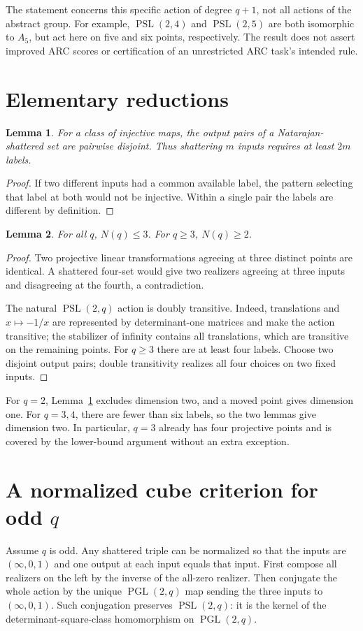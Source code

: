 \documentclass[11pt,a4paper]{article}
\newtheorem{lemma}{Lemma}
\DeclareMathOperator{\PSL}{PSL}
\DeclareMathOperator{\PGL}{PGL}
\begin{document}
The statement concerns this specific action of degree $q+1$, not all actions
of the abstract group. For example, $\PSL(2,4)$ and $\PSL(2,5)$ are both
isomorphic to $A_5$, but act here on five and six points, respectively.
The result does not assert improved ARC scores or certification of an
unrestricted ARC task's intended rule.

\section{Elementary reductions}
\begin{lemma}\label{lem:labels}
For a class of injective maps, the output pairs of a Natarajan-shattered
set are pairwise disjoint. Thus shattering $m$ inputs requires at least $2m$ labels.
\end{lemma}
\begin{proof}
If two different inputs had a common available label, the pattern selecting
that label at both would not be injective. Within a single pair the labels
are different by definition.
\end{proof}

\begin{lemma}\label{lem:bounds}
For all $q$, $N(q)\le3$. For $q\ge3$, $N(q)\ge2$.
\end{lemma}
\begin{proof}
Two projective linear transformations agreeing at three distinct points
are identical. A shattered four-set would give two realizers agreeing at
three inputs and disagreeing at the fourth, a contradiction.

The natural $\PSL(2,q)$ action is doubly transitive. Indeed, translations
and $x\mapsto-1/x$ are represented by determinant-one matrices and make
the action transitive; the stabilizer of infinity contains all translations,
which are transitive on the remaining points. For $q\ge3$ there are at least
four labels. Choose two disjoint output pairs; double transitivity realizes
all four choices on two fixed inputs.
\end{proof}

For $q=2$, Lemma~\ref{lem:labels} excludes dimension two, and a moved point
gives dimension one. For $q=3,4$, there are fewer than six labels, so the two
lemmas give dimension two. In particular, $q=3$ already has four projective
points and is covered by the lower-bound argument without an extra exception.

\section{A normalized cube criterion for odd \texorpdfstring{$q$}{q}}\label{sec:criterion}
Assume $q$ is odd. Any shattered triple can be normalized so that the inputs
are $(\infty,0,1)$ and one output at each input equals that input.
First compose all realizers on the left by the inverse of the all-zero
realizer. Then conjugate the whole action by the unique $\PGL(2,q)$ map
sending the three inputs to $(\infty,0,1)$. Such conjugation preserves
$\PSL(2,q)$: it is the kernel of the determinant-square-class homomorphism
on $\PGL(2,q)$.
\end{document}
